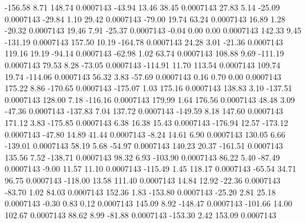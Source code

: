      -156.58        8.71      148.74     0.0007143
      -43.94       13.46       38.45     0.0007143
       27.83        5.14      -25.09     0.0007143
      -29.84        1.10       29.42     0.0007143
      -79.00       19.74       63.24     0.0007143
       16.89        1.28      -20.32     0.0007143
       19.46        7.91      -25.37     0.0007143
       -0.04        0.00        0.00     0.0007143
      142.33        9.45     -131.19     0.0007143
      157.50       10.19     -164.78     0.0007143
       24.28        3.01      -21.36     0.0007143
      119.16       19.19      -94.14     0.0007143
      -62.98        1.02       63.74     0.0007143
      108.88        9.69     -111.19     0.0007143
       79.53        8.28      -73.05     0.0007143
     -114.91       11.70      113.54     0.0007143
      109.74       19.74     -114.06     0.0007143
       56.32        3.83      -57.69     0.0007143
        0.16        0.70        0.00     0.0007143
      175.22        8.86     -170.65     0.0007143
     -175.07        1.03      175.16     0.0007143
      138.83        3.10     -137.51     0.0007143
      128.00        7.18     -116.16     0.0007143
      179.99        1.64      176.56     0.0007143
       48.48        3.09      -47.36     0.0007143
     -137.83        7.04      137.72     0.0007143
     -149.59        8.18      147.60     0.0007143
      171.12        3.83     -175.85     0.0007143
        6.38       16.38       15.43     0.0007143
     -176.94       12.57     -173.12     0.0007143
      -47.80       14.89       41.44     0.0007143
       -8.24       14.61        6.90     0.0007143
      130.05        6.66     -139.01     0.0007143
       58.19        5.68      -54.97     0.0007143
      140.23       20.37     -161.51     0.0007143
      135.56        7.52     -138.71     0.0007143
       98.32        6.93     -103.90     0.0007143
       86.22        5.40      -87.49     0.0007143
       -9.00       11.57       11.10     0.0007143
     -115.49        1.45      118.17     0.0007143
      -65.54       34.71       96.75     0.0007143
     -118.00       13.58      111.40     0.0007143
       14.84       12.92      -22.36     0.0007143
      -83.70        1.02       84.03     0.0007143
      152.36        1.83     -153.80     0.0007143
      -25.20        2.81       25.18     0.0007143
       -0.30        0.83        0.12     0.0007143
      145.09        8.92     -148.47     0.0007143
     -101.66       14.00      102.67     0.0007143
       88.62        8.99      -81.88     0.0007143
     -153.30        2.42      153.09     0.0007143
